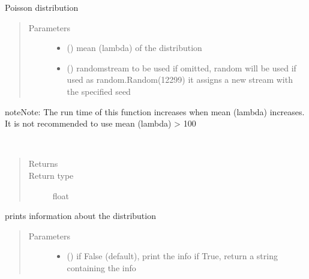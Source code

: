 \documentclass[letterpaper,10pt,english]{sphinxmanual}
\begin{document}
\begin{fulllineitems}
\label{\detokenize{Reference:salabim.Poisson}}
Poisson distribution
\begin{quote}\begin{description}
\item[{Parameters}] \leavevmode\begin{itemize}
\item {} 
 () \textendash{} mean (lambda) of the distribution

\item {} 
 () \textendash{} randomstream to be used 
if omitted, random will be used 
if used as random.Random(12299)
it assigns a new stream with the specified seed

\end{itemize}

\end{description}\end{quote}

\begin{sphinxadmonition}{note}{Note:}
The run time of this function increases when mean (lambda) increases. 
It is not recommended to use mean (lambda) \textgreater{} 100
\end{sphinxadmonition}

\begin{fulllineitems}
\label{\detokenize{Reference:salabim.Poisson.mean}}~\begin{quote}\begin{description}
\item[{Returns}] \leavevmode
{}

\item[{Return type}] \leavevmode
float

\end{description}\end{quote}

\end{fulllineitems}


\begin{fulllineitems}
\label{\detokenize{Reference:salabim.Poisson.print_info}}
prints information about the distribution
\begin{quote}\begin{description}
\item[{Parameters}] \leavevmode\begin{itemize}
\item {} 
 () \textendash{} if False (default), print the info
if True, return a string containing the info


\end{itemize}
\end{description}
\end{quote}
\end{fulllineitems}
\end{fulllineitems}
\end{document}
